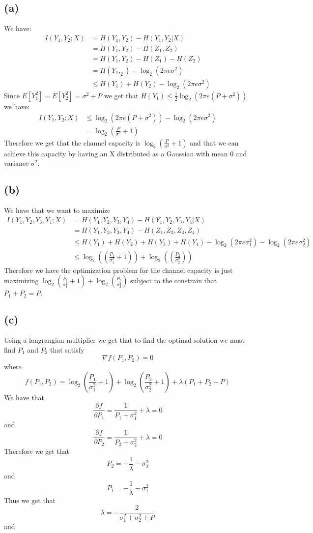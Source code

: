 \subsection*{(a)}
We have:
\begin{align*}
    I(Y_1,Y_2;X)&=H(Y_1,Y_2)-H(Y_1,Y_2|X)\\
    &=H(Y_1,Y_2)-H(Z_1,Z_2)\\
    &=H(Y_1,Y_2)-H(Z_1)-H(Z_2)\\
    &=H(Y_1,_2)-\log_2(2\pi e\sigma^2)\\
    &\leq H(Y_1)+H(Y_2)-\log_2(2\pi e\sigma^2)
\end{align*}
Since $E[Y_1^2]=E[Y_2^2]=\sigma^2+P$ we get that $H(Y_1)\leq \frac{1}{2}\log_2(2\pi e (P+\sigma^2))$
we have:
\begin{align*}
    I(Y_1,Y_2;X)&\leq \log_2(2\pi e (P+\sigma^2))-\log_2(2\pi e\sigma^2)\\
    &=\log_2\left(\frac{P}{\sigma^2}+1\right)
\end{align*}
Therefore we get that the channel capacity is $\boxed{\log_2\left(\frac{P}{\sigma^2}+1\right)}$
and that we can achieve this capacity by having an X distributed as a Gaussian with mean 0 and variance $\sigma^2$.
\subsection*{(b)}
We have that we want to maximize 
\begin{align*}
    I(Y_1,Y_2,Y_3,Y_4;X)&=H(Y_1,Y_2,Y_3,Y_4)-H(Y_1,Y_2,Y_3,Y_4|X)\\
    &=H(Y_1,Y_2,Y_3,Y_4)-H(Z_1,Z_2,Z_3,Z_4)\\
    &\leq H(Y_1)+H(Y_2)+H(Y_3)+H(Y_4)-\log_2(2\pi e\sigma_1^2)-\log_2(2\pi e\sigma_2^2)\\
    &\leq \log_2\left(\left(\frac{P_1}{\sigma_1^2}+1\right)\right)+
        \log_2\left(\left(\frac{P_2}{\sigma_2^2}\right)\right)
\end{align*}
Therefore we have the optimization problem for the channel capacity is just
maximizing $\log_2\left(\frac{P_1}{\sigma_1^2}+1\right)+
\log_2\left(\frac{P_2}{\sigma_2^2}\right)$ subject to 
the constrain that $P_1+P_2=P$.
\subsection*{(c)}
Using a langrangian multiplier we get that to find the optimal solution we must 
find $P_1$ and $P_2$ that satisfy 
$$\nabla f(P_1,P_2)=0$$
where 
$$f(P_1,P_2)=\log_2\left(\frac{P_1}{\sigma_1^2}+1\right)+
\log_2\left(\frac{P_2}{\sigma_2^2}+1\right)+\lambda(P_1+P_2-P)$$
We have that 
$$\frac{\partial f}{\partial P_1}=\frac{1}{P_1+\sigma_1^2}+\lambda=0$$
and
$$\frac{\partial f}{\partial P_2}=\frac{1}{P_2+\sigma_2^2}+\lambda=0$$
Therefore we get that 
$$P_2=-\frac{1}{\lambda}-\sigma_2^2$$
and 
$$P_1=-\frac{1}{\lambda}-\sigma_1^2$$
Thus we get that 
$$\lambda=-\frac{2}{\sigma^2_1+\sigma^2_2+P}$$
and


